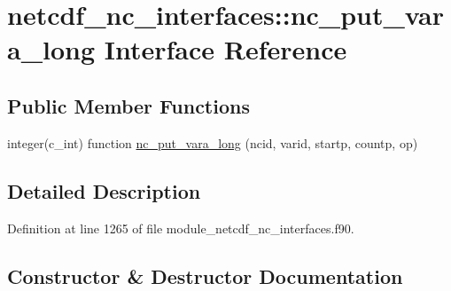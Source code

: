 \hypertarget{interfacenetcdf__nc__interfaces_1_1nc__put__vara__long}{}\section{netcdf\+\_\+nc\+\_\+interfaces\+:\+:nc\+\_\+put\+\_\+vara\+\_\+long Interface Reference}
\label{interfacenetcdf__nc__interfaces_1_1nc__put__vara__long}
\subsection*{Public Member Functions}
\begin{DoxyCompactItemize}
\item 
integer(c\+\_\+int) function \hyperlink{interfacenetcdf__nc__interfaces_1_1nc__put__vara__long_a193bc8c174bd591e2d8e15139c3c1ea5}{nc\+\_\+put\+\_\+vara\+\_\+long} (ncid, varid, startp, countp, op)
\end{DoxyCompactItemize}


\subsection{Detailed Description}


Definition at line 1265 of file module\+\_\+netcdf\+\_\+nc\+\_\+interfaces.\+f90.



\subsection{Constructor \& Destructor Documentation}
\mbox{\label{interfacenetcdf__nc__interfaces_1_1nc__put__vara__long_a193bc8c174bd591e2d8e15139c3c1ea5}} 
